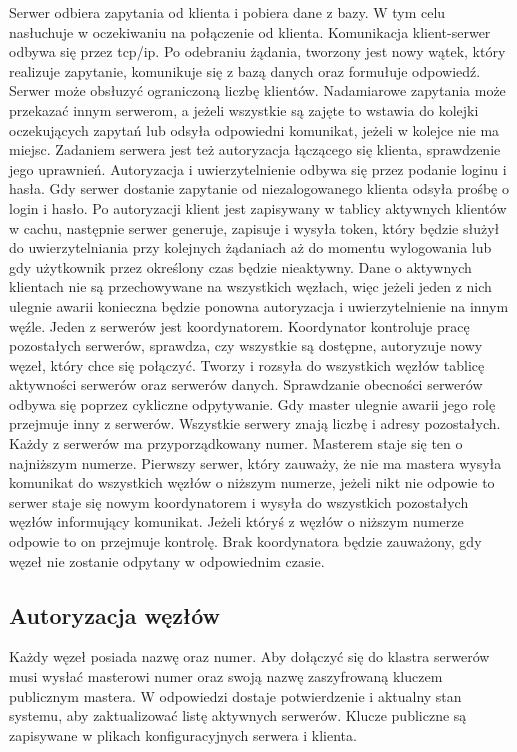 Serwer odbiera zapytania od klienta i pobiera dane z bazy. W tym celu nasłuchuje w oczekiwaniu na połączenie od klienta. Komunikacja klient-serwer odbywa się przez tcp/ip. Po odebraniu żądania, tworzony jest nowy wątek, który realizuje zapytanie, komunikuje się z bazą danych oraz formułuje odpowiedź. Serwer może obsłuzyć ograniczoną liczbę klientów. Nadamiarowe zapytania może przekazać innym serwerom, a jeżeli wszystkie są zajęte to wstawia do kolejki oczekujących zapytań lub odsyła odpowiedni komunikat, jeżeli w kolejce nie ma miejsc.
Zadaniem serwera jest też autoryzacja łączącego się klienta, sprawdzenie jego uprawnień. Autoryzacja i uwierzytelnienie odbywa się przez podanie loginu i hasła. Gdy serwer dostanie zapytanie od niezalogowanego klienta odsyła prośbę o login i hasło. Po autoryzacji klient jest zapisywany w tablicy aktywnych klientów w cachu, następnie serwer generuje, zapisuje i wysyła token, który będzie służył do uwierzytelniania przy kolejnych żądaniach aż do momentu wylogowania lub gdy użytkownik przez określony czas będzie nieaktywny. Dane o aktywnych klientach nie są przechowywane na wszystkich węzłach, więc jeżeli jeden z nich ulegnie awarii konieczna będzie ponowna autoryzacja i uwierzytelnienie na innym węźle.
Jeden z serwerów jest koordynatorem. Koordynator kontroluje pracę pozostałych serwerów, sprawdza, czy wszystkie są dostępne, autoryzuje nowy węzeł, który chce się połączyć. Tworzy i rozsyła do wszystkich węzłów tablicę aktywności serwerów oraz serwerów danych. Sprawdzanie obecności serwerów odbywa się poprzez cykliczne odpytywanie.
Gdy master ulegnie awarii jego rolę przejmuje inny z serwerów.
Wszystkie serwery znają liczbę i adresy pozostałych. Każdy z serwerów ma przyporządkowany numer. Masterem staje się ten o najniższym numerze. Pierwszy serwer, który zauważy, że nie ma mastera wysyła komunikat do wszystkich węzłów o niższym numerze, jeżeli nikt nie odpowie to serwer staje się nowym koordynatorem i wysyła do wszystkich pozostałych węzłów informujący komunikat. Jeżeli któryś z węzłów o niższym numerze odpowie to on przejmuje kontrolę. Brak koordynatora będzie zauważony, gdy węzeł nie zostanie odpytany w odpowiednim czasie.

\subsection{Autoryzacja węzłów}
Każdy węzeł posiada nazwę oraz numer. Aby dołączyć się do klastra serwerów musi wysłać masterowi numer oraz swoją nazwę zaszyfrowaną kluczem publicznym mastera. W odpowiedzi dostaje potwierdzenie i aktualny stan systemu, aby zaktualizować listę aktywnych serwerów.  Klucze publiczne są zapisywane w plikach konfiguracyjnych serwera i klienta.


